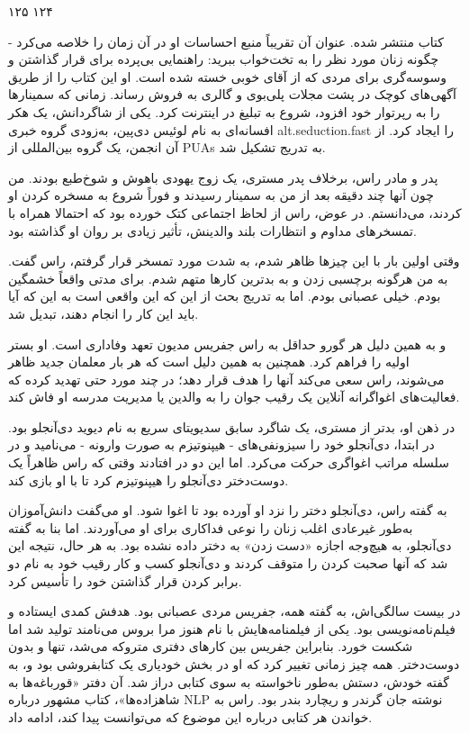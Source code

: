 ۱۲۵ ۱۲۴ 

کتاب منتشر شده. عنوان آن تقریباً منبع احساسات او در آن زمان را خلاصه می‌کرد - چگونه زنان مورد نظر را به تخت‌خواب ببرید: راهنمایی بی‌پرده برای قرار گذاشتن و وسوسه‌گری برای مردی که از آقای خوبی خسته شده است. او این کتاب را از طریق آگهی‌های کوچک در پشت مجلات پلی‌بوی و گالری به فروش رساند. زمانی که سمینارها را به رپرتوار خود افزود، شروع به تبلیغ در اینترنت کرد. یکی از شاگردانش، یک هکر افسانه‌ای به نام لوئیس دی‌پین، به‌زودی گروه خبری alt.seduction.fast را ایجاد کرد. از آن انجمن، یک گروه بین‌المللی از PUAs به تدریج تشکیل شد.

پدر و مادر راس، برخلاف پدر مستری، یک زوج یهودی باهوش و شوخ‌طبع بودند. من چون آنها چند دقیقه بعد از من به سمینار رسیدند و فوراً شروع به مسخره کردن او کردند، می‌دانستم. در عوض، راس از لحاظ اجتماعی کتک خورده بود که احتمالا همراه با تمسخرهای مداوم و انتظارات بلند والدینش، تأثیر زیادی بر روان او گذاشته بود.

وقتی اولین بار با این چیزها ظاهر شدم، به شدت مورد تمسخر قرار گرفتم، راس گفت. به من هرگونه برچسبی زدن و به بدترین کارها متهم شدم. برای مدتی واقعاً خشمگین بودم. خیلی عصبانی بودم. اما به تدریج بحث از این که این واقعی است به این که آیا باید این کار را انجام دهند، تبدیل شد.

و به همین دلیل هر گورو حداقل به راس جفریس مدیون تعهد وفاداری است. او بستر اولیه را فراهم کرد. همچنین به همین دلیل است که هر بار معلمان جدید ظاهر می‌شوند، راس سعی می‌کند آنها را هدف قرار دهد؛ در چند مورد حتی تهدید کرده که فعالیت‌های اغواگرانه آنلاین یک رقیب جوان را به والدین یا مدیریت مدرسه او فاش کند.

در ذهن او، بدتر از مستری، یک شاگرد سابق سدیویتای سریع به نام دیوید دی‌آنجلو بود. در ابتدا، دی‌آنجلو خود را سیزونفی‌های - هیپنوتیزم به صورت وارونه - می‌نامید و در سلسله مراتب اغواگری حرکت می‌کرد. اما این دو در افتادند وقتی که راس ظاهراً یک دوست‌دختر دی‌آنجلو را هیپنوتیزم کرد تا با او بازی کند.

به گفته راس، دی‌آنجلو دختر را نزد او آورده بود تا اغوا شود. او می‌گفت دانش‌آموزان به‌طور غیرعادی اغلب زنان را نوعی فداکاری برای او می‌آوردند. اما بنا به گفته دی‌آنجلو، به هیچ‌وجه اجازه «دست زدن» به دختر داده نشده بود. به هر حال، نتیجه این شد که آنها صحبت کردن را متوقف کردند و دی‌آنجلو کسب و کار رقیب خود به نام دو برابر کردن قرار گذاشتن خود را تأسیس کرد.

در بیست سالگی‌اش، به گفته همه، جفریس مردی عصبانی بود. هدفش کمدی ایستاده و فیلم‌نامه‌نویسی بود. یکی از فیلمنامه‌هایش با نام هنوز مرا بروس می‌نامند تولید شد اما شکست خورد. بنابراین جفریس بین کارهای دفتری متروکه می‌شد، تنها و بدون دوست‌دختر. همه چیز زمانی تغییر کرد که او در بخش خودیاری یک کتابفروشی بود و، به گفته خودش، دستش به‌طور ناخواسته به سوی کتابی دراز شد. آن دفتر «قورباغه‌ها به شاهزاده‌ها»، کتاب مشهور درباره NLP نوشته جان گرندر و ریچارد بندر بود. راس به خواندن هر کتابی درباره این موضوع که می‌توانست پیدا کند، ادامه داد.

